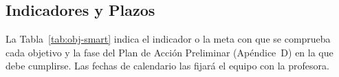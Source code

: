 \subsection{Indicadores y Plazos}
La Tabla~\ref{tab:obj-smart} indica el indicador o la meta con que se comprueba
cada objetivo y la fase del Plan de Acción Preliminar (Apéndice~D) en la que
debe cumplirse. Las fechas de calendario las fijará el equipo con la profesora.


